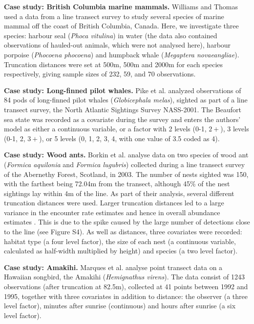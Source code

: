 \documentclass[10pt]{article}
\begin{document}
\textbf{Case study: British Columbia marine mammals.} Williams and Thomas \cite{Williams:2007tc} used a data from a line transect survey to study several species of marine mammal off the coast of British Columbia, Canada. Here, we investigate three species: harbour seal (\textit{Phoca vitulina}) in water (the data also contained observations of hauled-out animals, which were not analysed here), harbour porpoise (\textit{Phocoena phocoena}) and humpback whale (\textit{Megaptera novaeangliae}). Truncation distances were set at 500m, 500m and 2000m for each species respectively, giving sample sizes of 232, 59, and 70 observations. 

\textbf{Case study: Long-finned pilot whales.} Pike et al. \cite{Pike:2003ug} analyzed observations of 84 pods of long-finned pilot whales (\textit{Globicephala melas}), sighted as part of a line transect survey, the North Atlantic Sightings Survey NASS-2001. The Beaufort sea state was recorded as a covariate during the survey and enters the authors' model as either a continuous variable, or a factor with 2 levels (0-1, $2+$), 3 levels (0-1, 2, $3+$), or 5 levels (0, 1, 2, 3, 4, with one value of 3.5 coded as 4).
  
\textbf{Case study: Wood ants.} Borkin et al. \cite{Borkin:2012vj} analyse data on two species of wood ant (\textit{Formica aquilonia} and \textit{Formica lugubris}) collected during a line transect survey of the Abernethy Forest, Scotland, in 2003. The number of nests sighted was 150, with the farthest being 72.04m from the transect, although 45\% of the nest sightings lay within 4m of the line. As part of their analysis, several different truncation distances were used. Larger truncation distances led to a large variance in the encounter rate estimates and hence in overall abundance estimates \cite{Borkin:2012vj}. This is due to the spike caused by the large number of detections close to the line (see Figure S4). As well as distances, three covariates were recorded: habitat type (a four level factor), the size of each nest (a continuous variable, calculated as half-width multiplied by height) and species (a two level factor).  
    
\textbf{Case study: Amakihi.} Marques et al. \cite{Marques:2007vm} analyse point transect data on a Hawaiian songbird, the Amakihi (\textit{Hemignathus virens}). The data consist of 1243 observations (after truncation at 82.5m), collected at 41 points between 1992 and 1995, together with three covariates in addition to distance: the observer (a three level factor), minutes after sunrise (continuous) and hours after sunrise (a six level factor).
\end{document}
